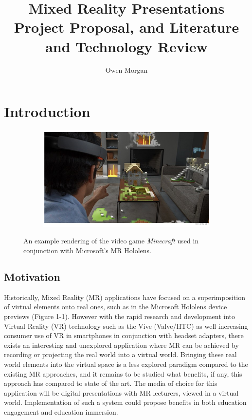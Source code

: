 \documentclass[11pt]{report}
\title{Mixed Reality Presentations\\Project Proposal, and Literature and Technology Review}
\author{Owen Morgan}
\date{}
\begin{document}
\maketitle
\chapter{Introduction}
\begin{figure}[h]
\centering
\begin{subfigure}[b]{0.7\textwidth}  
\includegraphics[width=\textwidth]{microsoft-minecraft.png}
\end{subfigure}
\caption{An example rendering of the video game \textit{Minecraft} used in conjunction with Microsoft's MR Hololens.\cite{Hollister2015}}
\end{figure}
\section{Motivation}
Historically, Mixed Reality (MR) applications have focused on a superimposition of virtual elements onto real ones, such as in the Microsoft Hololens device previews (Figure 1-1). However with the rapid research and development into Virtual Reality (VR) technology such as the Vive (Valve/HTC) as well increasing consumer use of VR in smartphones in conjunction with headset adapters, there exists an interesting and unexplored application where MR can be achieved by recording or projecting the real world into a virtual world. Bringing these real world elements into the virtual space is a less explored paradigm compared to the existing MR approaches, and it remains to be studied what benefits, if any, this approach has compared to state of the art. The media of choice for this application will be digital presentations with MR lecturers, viewed in a virtual world. Implementation of such a system could propose benefits in both education engagement and education immersion.
\end{document}
